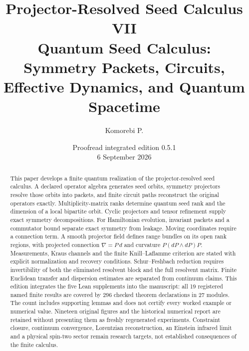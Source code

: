 \documentclass[11pt]{article}
\title{\textbf{Projector-Resolved Seed Calculus VII}\\[0.45em]
\large Quantum Seed Calculus: Symmetry Packets, Circuits, Effective Dynamics, and Quantum Spacetime}
\author{Komorebi P.}
\date{Proofread integrated edition 0.5.1\\6 September 2026}
\theoremstyle{definition}
\theoremstyle{remark}
\begin{document}
\maketitle

\begin{abstract}
This paper develops a finite quantum realization of the projector-resolved seed calculus. A declared operator algebra generates seed orbits, symmetry projectors resolve those orbits into packets, and finite circuit paths reconstruct the original operators exactly. Multiplicity-matrix ranks determine quantum seed rank and the dimension of a local bipartite orbit. Cyclic projectors and tensor refinement supply exact symmetry decompositions. For Hamiltonian evolution, invariant packets and a commutator bound separate exact symmetry from leakage. Moving coordinates require a connection term. A smooth projector field defines range bundles on its open rank regions, with projected connection $\nabla=P\,d$ and curvature $P(dP\wedge dP)P$. Measurements, Kraus channels and the finite Knill--Laflamme criterion are stated with explicit normalization and recovery conditions. Schur--Feshbach reduction requires invertibility of both the eliminated resolvent block and the full resolvent matrix. Finite Euclidean transfer and dispersion estimates are separated from continuum claims. This edition integrates the five Lean supplements into the manuscript: all 19 registered named finite results are covered by 296 checked theorem declarations in 27 modules. The count includes supporting lemmas and does not certify every worked example or numerical value. Nineteen original figures and the historical numerical report are retained without presenting them as freshly regenerated experiments. Constraint closure, continuum convergence, Lorentzian reconstruction, an Einstein infrared limit and a physical spin-two sector remain research targets, not established consequences of the finite calculus.
\end{abstract}

\begin{center}
\end{center}
\end{document}
